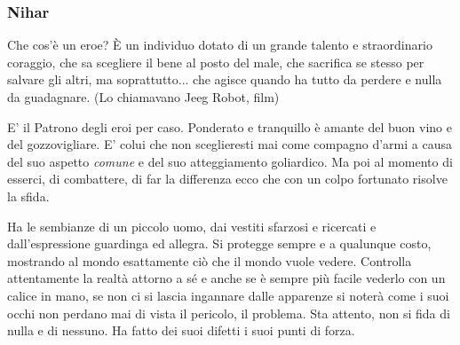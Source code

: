 \begin{multicols}{2}
\subsubsection{Nihar}\label{nihar}\hypertarget{nihar}{}

\begin{enfasi}{
Che cos'è un eroe? È un individuo dotato di un grande talento e straordinario coraggio, che sa scegliere il bene al posto del male, che sacrifica se stesso per salvare gli altri, ma soprattutto... che agisce quando ha tutto da perdere e nulla da guadagnare. (Lo chiamavano Jeeg Robot, film)
}\end{enfasi}

E' il Patrono degli eroi per caso. Ponderato e tranquillo è amante del buon vino e del gozzovigliare. E' colui che non sceglieresti mai come compagno d'armi a causa del suo aspetto \emph{comune} e del suo atteggiamento goliardico. Ma poi al momento di esserci, di combattere, di far la differenza ecco che con un colpo fortunato risolve la sfida.

Ha le sembianze di un piccolo uomo, dai vestiti sfarzosi e ricercati e dall'espressione guardinga ed allegra. Si protegge sempre e a qualunque costo, mostrando al mondo esattamente ciò che il mondo vuole vedere. Controlla attentamente la realtà attorno a sé e anche se è sempre più facile vederlo con un calice in mano, se non ci si lascia ingannare dalle apparenze si noterà come i suoi occhi non perdano mai di vista il pericolo, il problema. Sta attento, non si fida di nulla e di nessuno. Ha fatto dei suoi difetti i suoi punti di forza.


\end{multicols}
